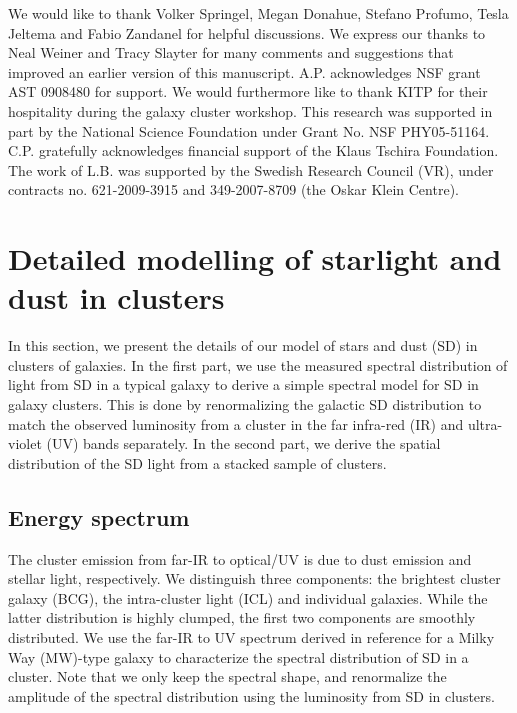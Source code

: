 \documentclass[10pt,aps,pra,reprint,amsmath,amsfonts,amssymb,showpacs,nofootinbib,floatfix]{revtex4-1}
\begin{document}


\smallskip We would like to thank Volker Springel, Megan Donahue,
Stefano Profumo, Tesla Jeltema and Fabio Zandanel for helpful
discussions.  We express our thanks to Neal Weiner and Tracy Slayter
for many comments and suggestions that improved an earlier version of
this manuscript. A.P. acknowledges NSF grant AST 0908480 for
support. We would furthermore like to thank KITP for their hospitality
during the galaxy cluster workshop.  This research was supported in
part by the National Science Foundation under Grant No. NSF
PHY05-51164.  C.P. gratefully acknowledges financial support of the
Klaus Tschira Foundation. The work of L.B. was supported by the
Swedish Research Council (VR), under contracts no. 621-2009-3915 and
349-2007-8709 (the Oskar Klein Centre).


\vspace{-0.7cm}

%
%

\appendix

\section{Detailed modelling of starlight and dust in clusters}
\label{sect:SD}
In this section, we present the details of our model of stars and dust
(SD) in clusters of galaxies. In the first part, we use the measured
spectral distribution of light from SD in a typical galaxy to derive a
simple spectral model for SD in galaxy clusters. This is done by
renormalizing the galactic SD distribution to match the observed luminosity
from a cluster in the far infra-red (IR) and ultra-violet (UV) bands
separately. In the second part, we derive the spatial distribution of
the SD light from a stacked sample of clusters.

\subsection{Energy spectrum}
The cluster emission from far-IR to optical/UV is due to dust emission
and stellar light, respectively. We distinguish three components: the
brightest cluster galaxy (BCG), the intra-cluster light (ICL) and
individual galaxies. While the latter distribution is highly clumped,
the first two components are smoothly distributed.  We use the far-IR
to UV spectrum derived in reference \cite{2006ApJ...648L..29P} for a
Milky Way (MW)-type galaxy to characterize the spectral distribution
of SD in a cluster. Note that we only keep the spectral shape, and
renormalize the amplitude of the spectral distribution using the
luminosity from SD in clusters.
\end{document}
